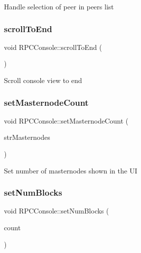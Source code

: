 Handle selection of peer in peers list \mbox{\label{class_r_p_c_console_aaea18a980de27ecf7d358158d44887d2}} 
\subsubsection{\texorpdfstring{scroll\+To\+End}{scrollToEnd}}
{\footnotesize\ttfamily void R\+P\+C\+Console\+::scroll\+To\+End (\begin{DoxyParamCaption}{ }\end{DoxyParamCaption})\hspace{0.3cm}{\ttfamily [slot]}}

Scroll console view to end \mbox{\label{class_r_p_c_console_a23a841c2142f7ac49506099334135cf5}} 
\subsubsection{\texorpdfstring{set\+Masternode\+Count}{setMasternodeCount}}
{\footnotesize\ttfamily void R\+P\+C\+Console\+::set\+Masternode\+Count (\begin{DoxyParamCaption}\item[{const Q\+String \&}]{str\+Masternodes }\end{DoxyParamCaption})\hspace{0.3cm}{\ttfamily [slot]}}

Set number of masternodes shown in the UI \mbox{\label{class_r_p_c_console_a98b7e85774a91d77c3b01276bd41bc51}} 
\subsubsection{\texorpdfstring{set\+Num\+Blocks}{setNumBlocks}}
{\footnotesize\ttfamily void R\+P\+C\+Console\+::set\+Num\+Blocks (\begin{DoxyParamCaption}\item[{int}]{count }\end{DoxyParamCaption})\hspace{0.3cm}{\ttfamily [slot]}}

